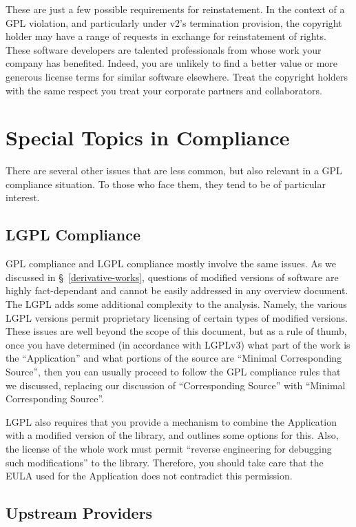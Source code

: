 \documentclass[letterpaper]{fixme}
\begin{document}
These are just a few possible requirements for reinstatement.  In the
context of a GPL violation, and particularly under v2's termination
provision, the copyright holder may have a range of requests in exchange
for reinstatement of rights.  These software developers are talented
professionals from whose work your company has benefited.  Indeed, you are
unlikely to find a better value or more generous license terms for similar
software elsewhere.  Treat the copyright holders with the same respect you
treat your corporate partners and collaborators.

\section{Special Topics in Compliance}

There are several other issues that are less common, but also relevant in
a GPL compliance situation.  To those who face them, they tend to be of
particular interest.

\subsection{LGPL Compliance}
\label{lgpl}

GPL compliance and LGPL compliance mostly involve the same issues.  As we
discussed in \S~\ref{derivative-works}, questions of modified versions of
software are highly fact-dependant and cannot be easily addressed in any
overview document.  The LGPL adds some additional complexity to the
analysis.  Namely, the various LGPL versions permit proprietary licensing
of certain types of modified versions.  These issues are well beyond the
scope of this document, but as a rule of thumb, once you have determined
(in accordance with LGPLv3) what part of the work is the ``Application''
and what portions of the source are ``Minimal Corresponding Source'', then
you can usually proceed to follow the GPL compliance rules that we
discussed, replacing our discussion of ``Corresponding Source'' with
``Minimal Corresponding Source''.

LGPL also requires that you provide a mechanism to combine the Application
with a modified version of the library, and outlines some options for
this.  Also, the license of the whole work must permit ``reverse
engineering for debugging such modifications'' to the library.  Therefore,
you should take care that the EULA used for the Application does not
contradict this permission.

\subsection{Upstream Providers}
\label{upstream}
\end{document}
